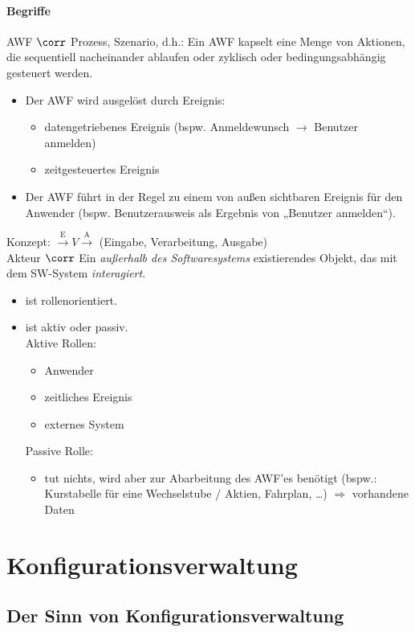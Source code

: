 \subsubsection*{Begriffe}
AWF $\corr$ Prozess, Szenario, d.h.: Ein AWF kapselt eine Menge von Aktionen, die sequentiell nacheinander ablaufen oder zyklisch oder bedingungsabhängig gesteuert werden.
\begin{itemize}
\item Der AWF wird ausgelöst durch Ereignis:
\begin{itemize}[label=$\to$]
\item datengetriebenes Ereignis (bspw. Anmeldewunsch $\to$ Benutzer anmelden)
\item zeitgesteuertes Ereignis
\end{itemize}
\item Der AWF führt in der Regel zu einem von außen sichtbaren Ereignis für den Anwender (bspw. Benutzerausweis als Ergebnis von „Benutzer anmelden“).
\end{itemize}
Konzept: $\overset{\text{E}}{\longrightarrow}\boxed{V}\overset{\text{A}}{\longrightarrow}$ (Eingabe, Verarbeitung, Ausgabe) \bigskip\\
Akteur $\corr$ Ein \emph{außerhalb des Softwaresystems} existierendes Objekt, das mit dem SW-System \emph{interagiert}.
\begin{itemize}
\item ist rollenorientiert.
\item ist aktiv oder passiv.\\
Aktive Rollen:
\begin{itemize}
\item Anwender
\item zeitliches Ereignis
\item externes System
\end{itemize}
Passive Rolle:
\begin{itemize}
\item tut nichts, wird aber zur Abarbeitung des AWF'es benötigt (bspw.: Kurstabelle für eine Wechselstube / Aktien, Fahrplan, …) $\Rightarrow$ vorhandene Daten
\end{itemize}
\end{itemize}

\chapter{Konfigurationsverwaltung}
\section{Der Sinn von Konfigurationsverwaltung}

